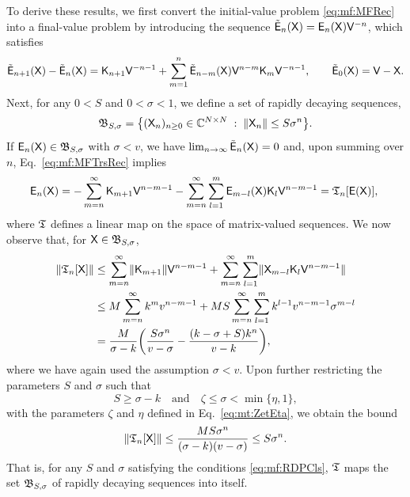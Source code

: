 \documentclass[aps,prl,reprint]{revtex4-2}
\begin{document}
To derive these results, we first convert the initial-value problem \eqref{eq:mf:MFRec} into a final-value problem by introducing the sequence $\tilde{\mathsf{E}}_n(\mathsf{X}) = \mathsf{E}_n(\mathsf{X})\mathsf{V}^{-n}$, which satisfies
\begin{equation}\label{eq:mf:MFTrsRec}
\tilde{\mathsf{E}}_{n+1}(\mathsf{X})-\tilde{\mathsf{E}}_n(\mathsf{X}) = \mathsf{K}_{n+1}\mathsf{V}^{-n-1}
+\sum_{m=1}^n \tilde{\mathsf{E}}_{n-m}(\mathsf{X})\mathsf{V}^{n-m}\mathsf{K}_m\mathsf{V}^{-n-1}, \qquad
\tilde{\mathsf{E}}_0(\mathsf{X})=\mathsf{V} -\mathsf{X}.
\end{equation}
Next, for any $0<S$ and $0<\sigma<1$, we define a set of rapidly decaying sequences,
\begin{equation}
\mathfrak{B}_{S,\sigma}
= \bigl\{(\mathsf{X}_n)_{n\geq 0}\in\mathbb{C}^{N\times N} \; : \; \lVert \mathsf{X}_n \rVert\leq S\sigma^n\bigr\}.
\end{equation}
If $\mathsf{E}_n(\mathsf{X})\in\mathfrak{B}_{S,\sigma}$ with $\sigma<v$, we have $\lim_{n\rightarrow\infty}\tilde{\mathsf{E}}_n(\mathsf{X}) = 0$ and, upon summing over $n$, Eq.~\eqref{eq:mf:MFTrsRec} implies
\begin{align}
\mathsf{E}_n(\mathsf{X})  = -\sum_{m=n}^\infty\mathsf{K}_{m+1}\mathsf{V}^{n-m-1}
-\sum_{m=n}^\infty\sum_{l=1}^m\mathsf{E}_{m-l}(\mathsf{X})\mathsf{K}_l\mathsf{V}^{n-m-1}
= \mathfrak{T}_n[\mathsf{E}(\mathsf{X})],\
\end{align}
where $\mathfrak{T}$ defines a linear map on the space of matrix-valued sequences.
We now observe that, for $\mathsf{X}\in\mathfrak{B}_{S,\sigma}$,
\begin{align}
\lVert \mathfrak{T}_n[\mathsf{X}] \rVert & \leq \sum_{m=n}^\infty\lVert \mathsf{K}_{m+1} \rVert\mathsf{V}^{n-m-1}
+ \sum_{m=n}^\infty\sum_{l=1}^m\lVert \mathsf{X}_{m-l}\mathsf{K}_l\mathsf{V}^{n-m-1} \rVert\\
& \leq M \sum_{m=n}^\infty k^{m}v^{n-m-1} + MS\sum_{m=n}^\infty\sum_{l=1}^m
k^{l-1} v^{n-m-1}\sigma^{m-l}\nonumber\\
& =\frac{M}{\sigma-k}\biggl(\frac{S\sigma^n}{v-\sigma}-\frac{(k-\sigma+S)k^n}{v-k}\biggr),
\nonumber
\end{align}
where we have again used the assumption $\sigma<v$.
Upon further restricting the parameters $S$ and $\sigma$ such that
\begin{equation}\label{eq:mf:RDPCls}
S\geq \sigma -k \quad\text{and}\quad \zeta \leq \sigma < \min\{\eta,1\},
\end{equation}
with the parameters $\zeta$ and $\eta$ defined in Eq.~\eqref{eq:mt:ZetEta}, we obtain the bound
\begin{equation}
\lVert \mathfrak{T}_n[\mathsf{X}] \rVert\leq \frac{M S\sigma^n}{(\sigma-k)(v-\sigma)} \leq S\sigma^n.
\end{equation}
That is, for any $S$ and $\sigma$ satisfying the conditions \eqref{eq:mf:RDPCls}, $\mathfrak{T}$ maps the set $\mathfrak{B}_{S,\sigma}$ of rapidly decaying sequences into itself.
\end{document}
